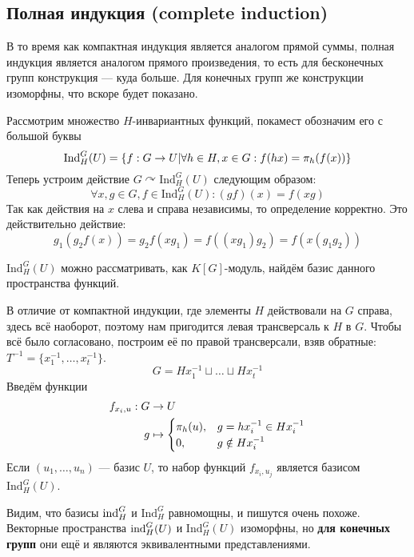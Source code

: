 \subsection{Полная индукция (complete induction)}
В то время как компактная индукция является аналогом прямой суммы, полная индукция является аналогом прямого произведения, то есть для бесконечных групп конструкция --- куда больше.
Для конечных групп же конструкции изоморфны, что вскоре будет показано.

Рассмотрим множество $H$-инвариантных функций, покамест обозначим его с большой буквы
\[\text{Ind}_H^G(U) = \left\{f: G \rightarrow U\middle|\forall h \in H, x \in G: f(hx) = \pi_h(f(x))\right\}\]
Теперь устроим действие $G \curvearrowright \text{Ind}^G_H(U)$ следующим образом:
\[\forall x, g \in G, f \in \text{Ind}_H^G(U): (gf)(x) = f\left(xg\right)\]
Так как действия на $x$ слева и справа независимы, то определение корректно.
Это действительно действие:
\[g_1(g_2f(x)) = g_2f(xg_1) = f((x g_1)g_2) = f(x (g_1 g_2))\]

$\text{Ind}_H^G(U)$ можно рассматривать, как $K[G]$-модуль, найдём базис данного пространства функций.

В отличие от компактной индукции, где элементы $H$ действовали на $G$ справа, здесь всё наоборот, поэтому нам пригодится левая трансверсаль к $H$ в $G$.
Чтобы всё было согласовано, построим её по правой трансверсали, взяв обратные: $T^{-1} = \{x_1^{-1}, \dots, x_t^{-1}\}$.
\[G = H x_1^{-1} \sqcup \dots \sqcup H x_t^{-1}\]
Введём функции \begin{align*}
                   f_{x_i, u}: G &\rightarrow U \\g &\mapsto \begin{cases}\pi_h(u),&g = hx_i^{-1} \in Hx_i^{-1} \\ 0,& g \notin Hx_i^{-1}\end{cases}
\end{align*}
Если $(u_1, \dots, u_n)$ --- базис $U$, то набор функций $f_{x_i,u_j}$ является базисом $\text{Ind}_H^G(U)$.

Видим, что базисы $\operatorname{ind}_H^G$ и $\text{Ind}_H^G$ равномощны, и пишутся очень похоже.
Векторные пространства $\operatorname{ind}_H^G(U)$ и $\text{Ind}_H^G(U)$ изоморфны, но \textbf{для конечных групп} они ещё и являются эквивалентными представлениями.

